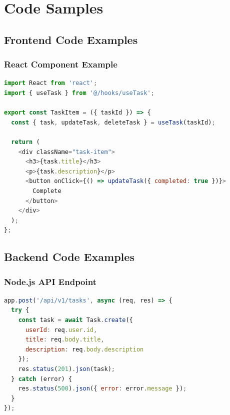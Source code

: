 \chapter{Code Samples}
\label{appendix:code-samples}

\section{Frontend Code Examples}

\subsection{React Component Example}

\begin{lstlisting}[language=JavaScript, caption=Task Component]
import React from 'react';
import { useTask } from '@/hooks/useTask';

export const TaskItem = ({ taskId }) => {
  const { task, updateTask, deleteTask } = useTask(taskId);
  
  return (
    <div className="task-item">
      <h3>{task.title}</h3>
      <p>{task.description}</p>
      <button onClick={() => updateTask({ completed: true })}>
        Complete
      </button>
    </div>
  );
};
\end{lstlisting}

\section{Backend Code Examples}

\subsection{Node.js API Endpoint}

\begin{lstlisting}[language=JavaScript, caption=Task API Endpoint]
app.post('/api/v1/tasks', async (req, res) => {
  try {
    const task = await Task.create({
      userId: req.user.id,
      title: req.body.title,
      description: req.body.description
    });
    res.status(201).json(task);
  } catch (error) {
    res.status(500).json({ error: error.message });
  }
});
\end{lstlisting}

